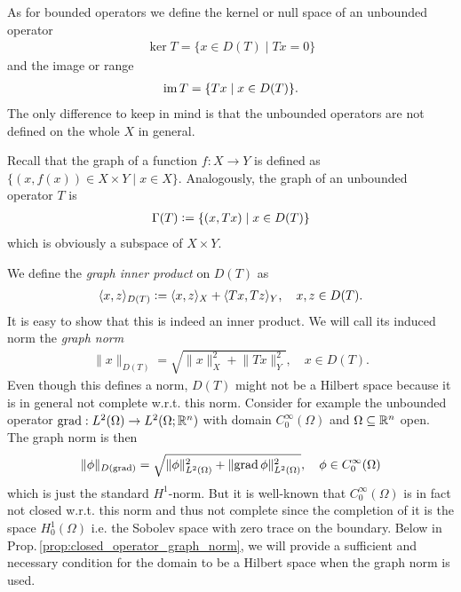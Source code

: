 \documentclass[../master_thesis.tex]{subfiles}
\begin{document}
As for bounded operators we define the kernel or null space of an unbounded
operator 
\begin{align*}
    \ker T = \{ x \in D(T) \mid Tx = 0\}
\end{align*}
and the image or range
\begin{align*}
    \operatorname{im} T = \{ Tx \mid x \in D(T)\}.
\end{align*}
The only difference to keep in mind is that the unbounded operators are not 
defined on the whole $X$ in general.

Recall that the graph of a function $f: X \rightarrow Y$ is defined 
as $\{ (x,f(x)) \in X \times Y \mid x \in X\}$. 
Analogously, the graph of an unbounded operator $T$ is 
\begin{align*}
    \Gamma(T) \vcentcolon= \{ (x,Tx) \mid x \in D(T) \}
\end{align*}
which is obviously a subspace of $X\times Y$.

We define the \textit{graph inner product} on $D(T)$ as 
\begin{align*}
    \langle x,z \rangle _{D(T)} 
    \vcentcolon= \langle x,z \rangle _X + \langle Tx, Tz \rangle _Y,
    \quad x,z \in D(T).
\end{align*}
It is easy to show that this is indeed an inner product. We will call its 
induced norm the \textit{graph norm}
\begin{align*}
    \lVert x \rVert _{D(T)} = \sqrt{ \lVert x \rVert^2 _X + \lVert Tx \rVert ^2 _Y}
    , \quad x\in D(T).
\end{align*}
Even though this defines a norm, $D(T)$ might not be a Hilbert space 
because it is in general not complete w.r.t. this norm. Consider for example 
the unbounded operator $\operatorname{grad}: L^2(\Omega) \rightarrow L^2(\Omega;\mathbb{R}^n)$ with 
domain $C_0^\infty(\Omega)$ and $\Omega \subseteq \mathbb{R}^n$ open.
The graph norm is then 
\begin{align*}
    \lVert \phi \rVert _{D(\operatorname{grad})} 
    = \sqrt{ \lVert \phi \rVert^2 _{L^2(\Omega)} + \lVert \operatorname{grad} \phi \rVert^2 
        _{L^2(\Omega)}}
        , \quad \phi \in C_0^\infty(\Omega)
\end{align*}
which is just the standard $H^1$-norm.
But it is well-known that $C_0^\infty(\Omega)$ is in fact not closed 
w.r.t. this norm and thus not complete 
since the completion of it is the space $H^1_0(\Omega)$ i.e. 
the Sobolev space with zero trace on the boundary. 
Below in Prop.\,\ref{prop:closed_operator_graph_norm}, we will provide a
sufficient and necessary condition for the domain to be a Hilbert space 
when the graph norm is used. 
\end{document}
